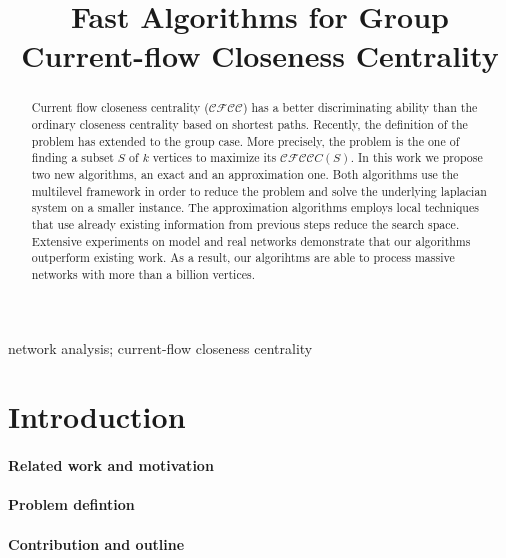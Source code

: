 \documentclass[10pt, conference, compsocconf]{IEEEtran}
\author{\IEEEauthorblockN{Gabriel Stoszek}
\IEEEauthorblockA{Karlsruhe Institute of Technology (KIT), Germany\\
Email: rolandglantz@gmail.com}
\and
\IEEEauthorblockN{Maria Predari}
\IEEEauthorblockA{University of Cologne, Germany\\
Email: mpredari@uni-koeln.de}
\and
\IEEEauthorblockN{Henning Meyerhenke}
\IEEEauthorblockA{University of Cologne, Germany\\
Email: h.meyerhenke@uni-koeln.de}
}
\newcommand{\cfc}{$\mathcal{CFCC}$}
\begin{document}
 \title{Fast Algorithms for Group Current-flow Closeness Centrality}

\maketitle 

\begin{abstract}
  Current flow closeness centrality (\cfc) has a better discriminating ability than the ordinary closeness centrality based on shortest paths.
  Recently, the definition of the problem has extended to the group case. More precisely, the problem is the one of   
  finding a subset $S$ of $k$ vertices to maximize its \cfc $C(S)$. In this work we propose two new algorithms, an exact and
  an approximation one. Both algorithms use the multilevel framework in order to reduce the problem
  and solve the underlying laplacian system on a smaller instance.
  The approximation algorithms employs local techniques that use already existing information from previous steps
  reduce the search space. Extensive experiments on model and real networks demonstrate that our algorithms
  outperform existing work. As a result, our algorihtms are able to process massive networks with more than a billion vertices.
\end{abstract}

\begin{IEEEkeywords}
network analysis; current-flow closeness centrality
\end{IEEEkeywords}



%
%
\section{Introduction}
\label{sec:intro}


\paragraph{Related work and motivation}
\paragraph{Problem defintion}
\paragraph{Contribution and outline}
\end{document}
